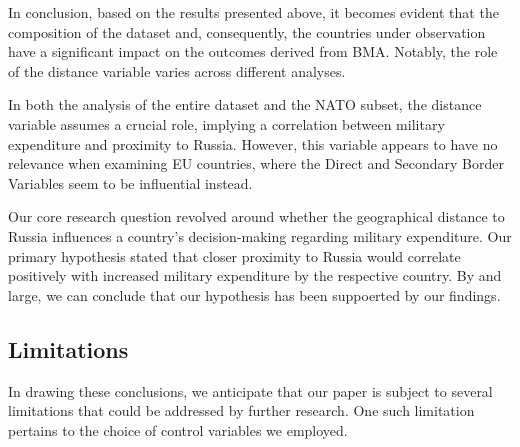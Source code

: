 \documentclass[12pt,a4paper]{article}
\begin{document}
In conclusion, based on the results presented above, it becomes evident that the composition of the dataset and, consequently, the countries under observation have a significant impact on the outcomes derived from BMA. Notably, the role of the distance variable varies across different analyses. 

In both the analysis of the entire dataset and the NATO subset, the distance variable assumes a crucial role, implying a correlation between military expenditure and proximity to Russia. However, this variable appears to have no relevance when examining EU countries, where the Direct and Secondary Border Variables seem to be influential instead.

Our core research question revolved around whether the geographical distance to Russia influences a country's decision-making regarding military expenditure. Our primary hypothesis stated that closer proximity to Russia would correlate positively with increased military expenditure by the respective country. By and large, we can conclude that our hypothesis has been suppoerted by our findings. \\

\subsection{Limitations}
In drawing these conclusions, we anticipate that our paper is subject to several limitations that could be addressed by further research. One such limitation pertains to the choice of control variables we employed.
\end{document}
